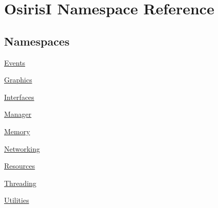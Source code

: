 \hypertarget{namespace_osiris_i}{\section{Osiris\-I Namespace Reference}
\label{namespace_osiris_i}
}
\subsection*{Namespaces}
\begin{DoxyCompactItemize}
\item 
\hyperlink{namespace_osiris_i_1_1_events}{Events}
\item 
\hyperlink{namespace_osiris_i_1_1_graphics}{Graphics}
\item 
\hyperlink{namespace_osiris_i_1_1_interfaces}{Interfaces}
\item 
\hyperlink{namespace_osiris_i_1_1_manager}{Manager}
\item 
\hyperlink{namespace_osiris_i_1_1_memory}{Memory}
\item 
\hyperlink{namespace_osiris_i_1_1_networking}{Networking}
\item 
\hyperlink{namespace_osiris_i_1_1_resources}{Resources}
\item 
\hyperlink{namespace_osiris_i_1_1_threading}{Threading}
\item 
\hyperlink{namespace_osiris_i_1_1_utilities}{Utilities}
\end{DoxyCompactItemize}
